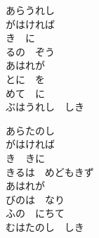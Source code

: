 \documentclass[10pt,b5j]{tarticle} %
\begin{document}
\vspace{1.5em} %
\newcommand{\linespace}{0.5em} %
\newcommand{\blocksize}{0.5\hsize} %
\begin{enumerate} %
    \begin{minipage}[c]{\blocksize}
    
        \vspace{\linespace}
        \item
        あらうれし\\
        がはければ\\
        き　に\\
        るの　ぞう\\
        あはれが\\
        とに　を\\
        めて　に\\
        ぶはうれし　しき
        
        \vspace{\linespace}
        \item
        あらたのし\\
        がはければ\\
        き　きに\\
        きるは　めどもきず\\
        あはれが\\
        びのは　なり\\
        ふの　にちて\\
        むはたのし　しき
    
    \end{minipage}
\end{enumerate} %
\end{document}
